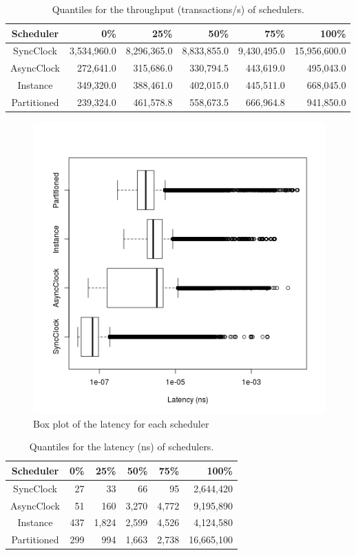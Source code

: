 \begin{table}
\begin{tabular}{crrrrr}
Scheduler &       0\%  &    25\%  &    50\%  &    75\%  &   100\% \\
\hline
SyncClock   & 3,534,960.0 & 8,296,365.0 & 8,833,855.0 & 9,430,495.0 & 15,956,600.0 \\
AsyncClock  &   272,641.0 &   315,686.0 &   330,794.5 &   443,619.0 &    495,043.0 \\
Instance    &   349,320.0 &   388,461.0 &   402,015.0 &   445,511.0 &    668,045.0 \\
Partitioned &   239,324.0 &   461,578.8 &   558,673.5 &   666,964.8 &    941,850.0 \\
\end{tabular}
\caption{Quantiles for the throughput (transactions/s) of schedulers. \label{throughput_quantiles}}
\end{table}

\begin{figure}
\center
\includegraphics[width=\textwidth]{latency_box.png}
\caption{Box plot of the latency for each scheduler \label{latency_box}}
\end{figure}

\begin{table}
\begin{tabular}{crrrrr}
Scheduler &       0\%  &    25\%  &    50\%  &    75\%  &   100\% \\
\hline
SyncClock   & 27  &    33 &    66 &    95 &  2,644,420 \\
AsyncClock  & 51  &   160 & 3,270 & 4,772 &  9,195,890 \\
Instance    & 437 & 1,824 & 2,599 & 4,526 &  4,124,580 \\
Partitioned & 299 &   994 & 1,663 & 2,738 & 16,665,100 \\
\end{tabular}
\caption{Quantiles for the latency (ns) of schedulers. \label{latency_quantiles}}
\end{table}

